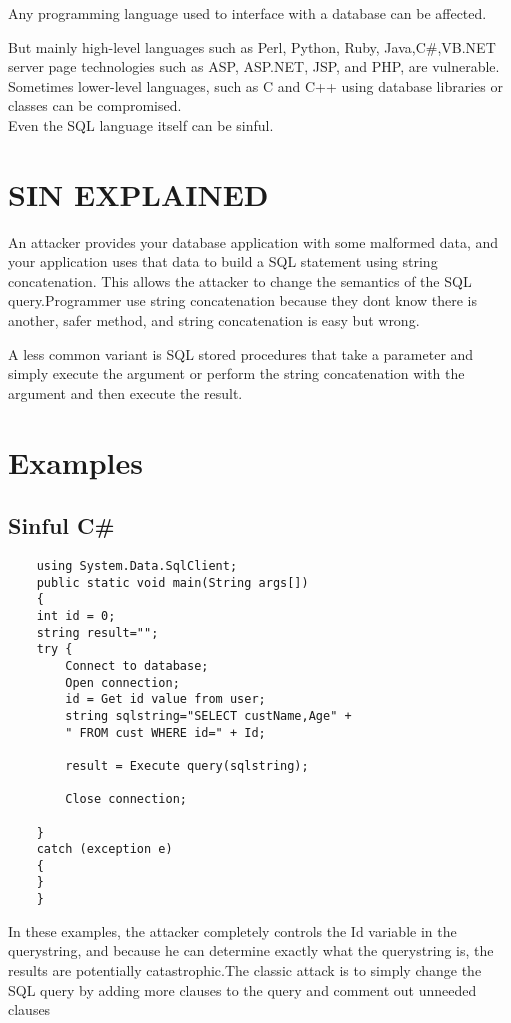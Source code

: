 \documentclass[a4paper, 11pt]{article} %
\begin{document}
	Any programming language used to interface with a database can be affected.
	
	But mainly high-level languages such as Perl, Python, Ruby, Java,C\#,VB.NET \\
	server page technologies such as ASP, ASP.NET, JSP, and PHP,  are vulnerable.\\
	 Sometimes lower-level languages, such as C and C++ using database libraries or classes can be compromised.\\
	  Even the SQL language itself can be sinful.
	
	\section *{SIN EXPLAINED}
	
	An attacker provides your database application with some malformed data, and your application uses that data to build a SQL statement using string concatenation. This allows the attacker to change the semantics of the SQL query.Programmer use string concatenation because they dont know
	there is another, safer method, and string concatenation is easy but wrong.

	A less common variant is SQL stored procedures that take a parameter and simply execute the argument or perform the string concatenation with the argument and then execute the result.
	
	\section*{Examples}
	\subsection*{Sinful C\#}
	\begin{verbatim}
	using System.Data.SqlClient;
	public static void main(String args[])
	{
	int id = 0;
	string result="";
	try {
		Connect to database;
		Open connection;
		id = Get id value from user;
		string sqlstring="SELECT custName,Age" +
		" FROM cust WHERE id=" + Id;
		
		result = Execute query(sqlstring);
		
		Close connection;
		
	}
	catch (exception e)
	{
	}
	}
	\end{verbatim}
	
	In these examples, the attacker completely controls the Id variable in the
	querystring, and because he can determine exactly what the querystring is, the results are
	potentially catastrophic.The classic attack is to simply change the SQL query by adding more clauses to the query and comment out unneeded clauses
	
\end{document}
